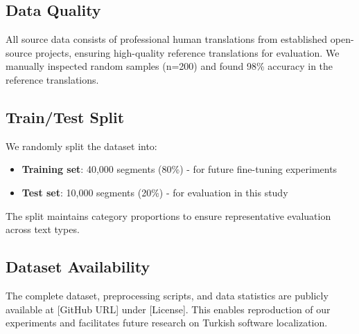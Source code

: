 \subsection{Data Quality}

All source data consists of professional human translations from established open-source projects, ensuring high-quality reference translations for evaluation. We manually inspected random samples (n=200) and found 98\% accuracy in the reference translations.

\subsection{Train/Test Split}

We randomly split the dataset into:
\begin{itemize}
    \item \textbf{Training set}: 40,000 segments (80\%) - for future fine-tuning experiments
    \item \textbf{Test set}: 10,000 segments (20\%) - for evaluation in this study
\end{itemize}

The split maintains category proportions to ensure representative evaluation across text types.

\subsection{Dataset Availability}

The complete dataset, preprocessing scripts, and data statistics are publicly available at [GitHub URL] under [License]. This enables reproduction of our experiments and facilitates future research on Turkish software localization.

